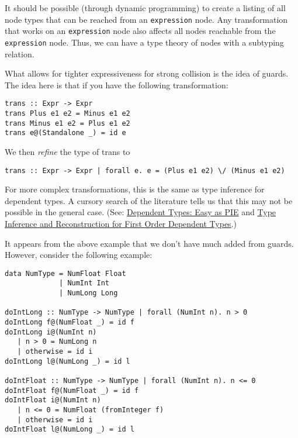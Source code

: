 \documentclass[11pt]{article}
\begin{document}
It should be possible (through dynamic programming) to create a listing of all node types that can be reached from an \verb~expression~ node. Any transformation that works on an \verb~expression~ node also affects all nodes reachable from the \verb~expression~ node. Thus, we can have a type theory of nodes with a subtyping relation.

What allows for tighter expressiveness for strong collision is the idea of guards. The idea here is that if you have the following transformation:

\begin{lstlisting}
trans :: Expr -> Expr
trans Plus e1 e2 = Minus e1 e2
trans Minus e1 e2 = Plus e1 e2
trans e@(Standalone _) = id e
\end{lstlisting}

We then \emph{refine} the type of trans to 

\begin{lstlisting}
trans :: Expr -> Expr | forall e. e = (Plus e1 e2) \/ (Minus e1 e2)
\end{lstlisting} 

For more complex transformations, this is the same as type inference for dependent types. A cursory search of the literature tells us that this may not be possible in the general case. (See: \href{http://research.microsoft.com/en-us/people/dimitris/pie.pdf}{Dependent Types: Easy as PIE} and \href{http://www.google.com/url?sa=t&rct=j&q=&esrc=s&source=web&cd=3&cad=rja&ved=0CDsQFjAC&url=http%3A%2F%2Fciteseerx.ist.psu.edu%2Fviewdoc%2Fdownload%3Fdoi%3D10.1.1.30.8049%26rep%3Drep1%26type%3Dpdf&ei=kOdXUIKzD8jp0QHzmoCwBg&usg=AFQjCNHhbxCQcN_3CiBI3SMJyzZpzvDrkw}{Type Inference and Reconstruction for First Order Dependent Types}.)

It appears from the above example that we don't have much added from guards. However, consider the following example:

\begin{lstlisting}
data NumType = NumFloat Float
             | NumInt Int   
             | NumLong Long 

doIntLong :: NumType -> NumType | forall (NumInt n). n > 0
doIntLong f@(NumFloat _) = id f
doIntLong i@(NumInt n)
   | n > 0 = NumLong n 
   | otherwise = id i
doIntLong l@(NumLong _) = id l

doIntFloat :: NumType -> NumType | forall (NumInt n). n <= 0
doIntFloat f@(NumFloat _) = id f
doIntFloat i@(NumInt n)
   | n <= 0 = NumFloat (fromInteger f) 
   | otherwise = id i                  
doIntFloat l@(NumLong _) = id l
\end{lstlisting}
\end{document}
